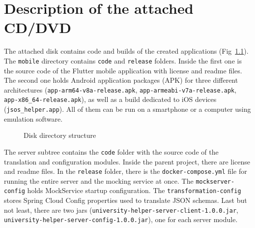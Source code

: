 \chapter{Description of the attached CD/DVD}
The attached disk contains code and builds of the created applications (Fig~\ref{fig:directory structure}). The \texttt{mobile} directory contains \texttt{code} and \texttt{release} folders. Inside the first one is the source code of the Flutter mobile application with license and readme files. The second one holds Android application packages (APK) for three different architectures (\texttt{app-arm64-v8a-release.apk}, \texttt{app-armeabi-v7a-release.apk}, \texttt{app-x86\_64-release.apk}), as well as a build dedicated to iOS devices (\texttt{jsos\_helper.app}). All of them can be run on a smartphone or a computer using emulation software.

\begin{figure}[htb]
    \footnotesize{}
    \caption{Disk directory structure} \label{fig:directory structure}
\end{figure}

The server subtree contains the \texttt{code} folder with the source code of the translation and configuration modules. Inside the parent project, there are license and readme files. In the \texttt{release} folder, there is the \texttt{docker-compose.yml} file for running the entire server and the mocking service at once. The \texttt{mockserver-config} holds MockService startup configuration. The \texttt{transformation-config} stores Spring Cloud Config properties used to translate JSON schemas. Last but not least, there are two jars (\texttt{university-helper-server-client-1.0.0.jar}, \texttt{university-helper-server-config-1.0.0.jar}), one for each server module.

